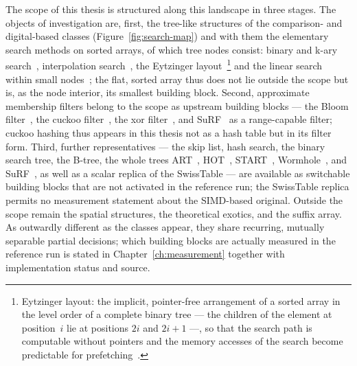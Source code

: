 \begin{nurlang}
The scope of this thesis is structured along this landscape in three stages. The objects of investigation
are, first, the tree-like structures of the comparison- and digital-based classes
(Figure~\ref{fig:search-map}) and with them the elementary search methods on sorted arrays, of which
tree nodes consist: binary and k-ary search~\cite{knuth1998taocp3,schlegel2009kary}, interpolation
search~\cite{perl1978interpolation}, the Eytzinger
layout~\cite{khuong2017eytzinger}\footnote{Eytzinger layout: the implicit, pointer-free arrangement of a
sorted array in the level order of a complete binary tree --- the children of the element at
position~$i$ lie at positions $2i$ and $2i+1$ ---, so that the search path is computable without pointers
and the memory accesses of the search become predictable for
prefetching~\cite{khuong2017eytzinger}.} and the linear search within small nodes~\cite{leis2013art};
the flat, sorted array thus does not lie outside the scope but is, as the node interior, its smallest
building block. Second, approximate membership filters belong to the scope as upstream building
blocks --- the Bloom filter~\cite{bloom1970}, the cuckoo filter~\cite{fan2014cuckoo}, the xor
filter~\cite{graf2020xor}, and SuRF~\cite{zhang2018surf} as a range-capable filter; cuckoo hashing thus
appears in this thesis not as a hash table but in its filter form. Third, further representatives ---
the skip list, hash search, the binary search tree, the B-tree, the whole trees
ART~\cite{leis2013art}, HOT~\cite{binna2018hot}, START~\cite{fent2020start},
Wormhole~\cite{wu2019wormhole}, and SuRF~\cite{zhang2018surf}, as well as a scalar replica of the
SwissTable --- are available as switchable building blocks that are not activated in the reference run;
the SwissTable replica permits no measurement statement about the SIMD-based original. Outside the
scope remain the spatial structures, the theoretical exotics, and the suffix array. As outwardly
different as the classes appear, they share recurring, mutually separable partial decisions; which
building blocks are actually measured in the reference run is stated in Chapter~\ref{ch:measurement}
together with implementation status and source.
\end{nurlang}
